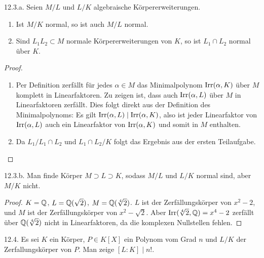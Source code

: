 \documentclass{article}
\newcommand{\ex}[1]{\tit{Übung} #1.}
\begin{document}
		\newpar
		\ex{12.3.a} Seien $M/L$ und $L/K$ algebraische Körpererweiterungen.
		\begin{enumerate}
			\item Ist $M/K$ normal, so ist auch $M/L$ normal.
			\item Sind $L_1 L_2 \subset M$ normale Körpererweiterungen von $K$, so ist $L_1 \cap L_2$ normal über $K$.
		\end{enumerate}
		\begin{proof}
			\begin{enumerate}
				\item Per Definition zerfällt für jedes $\alpha \in M$ das Minimalpolynom $\textnormal{Irr}(\alpha, K)$ über $M$ komplett in Linearfaktoren. Zu zeigen ist, dass auch $\textnormal{Irr}(\alpha, L)$ über $M$ in Linearfaktoren zerfällt.
				\newpar
				Dies folgt direkt aus der Definition des Minimalpolynoms: Es gilt $\textnormal{Irr}(\alpha, L) \mid \textnormal{Irr}(\alpha, K)$, also ist jeder Linearfaktor von $\textnormal{Irr}(\alpha, L)$ auch ein Linearfaktor von $\textnormal{Irr}(\alpha, K)$ und somit in $M$ enthalten.
				\item Da $L_1/L_1 \cap L_2$ und $L_1 \cap L_2 / K$ folgt das Ergebnis aus der ersten Teilaufgabe.
			\end{enumerate}
		\end{proof}
		\ex{12.3.b} Man finde Körper $M \supset L \supset K$, sodass $M/L$ und $L/K$ normal sind, aber $M/K$ nicht.
		\begin{proof}
			$K = \mathbb{Q}$, $L = \mathbb{Q}(\sqrt{2})$, $M = \mathbb{Q}(\sqrt[4]{2})$. $L$ ist der Zerfällungskörper von $x^2 - 2$, und $M$ ist der Zerfällungskörper von $x^2 - \sqrt{2}$. Aber $\textnormal{Irr}(\sqrt[4]{2}, \mathbb{Q}) = x^4 - 2$ zerfällt über $\mathbb{Q}(\sqrt[4]{2})$ nicht in Linearfaktoren, da die komplexen Nullstellen fehlen.
		\end{proof}
		\newpar
		\ex{12.4} Es sei $K$ ein Körper, $P \in K[X]$ ein Polynom vom Grad $n$ und $L/K$ der Zerfallungskörper von $P$. Man zeige $[L:K] \mid n!$.
\end{document}
